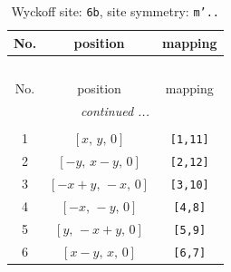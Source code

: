 \documentclass[fleqn,8pt]{jsarticle}
\begin{document}
\begin{longtable}{ccc}
\caption{Wyckoff site: {\tt 6b}, site symmetry: {\tt m'..}}
 \\
 \hline \hline
No. & position & mapping \\ \hline \endfirsthead

\multicolumn{2}{l}{\tablename\ \thetable{}} \\
 \hline \hline
No. & position & mapping \\ \hline \endhead

 \hline \hline
\multicolumn{2}{r}{\footnotesize\it continued ...} \\ \endfoot

 \hline \hline
\multicolumn{2}{r}{} \\ \endlastfoot

1 & $\left[ x,\, y,\, 0 \right]$ & {\tt [1,11]} \\ \hline
2 & $\left[ - y,\, x - y,\, 0 \right]$ & {\tt [2,12]} \\ \hline
3 & $\left[ - x + y,\, - x,\, 0 \right]$ & {\tt [3,10]} \\ \hline
4 & $\left[ - x,\, - y,\, 0 \right]$ & {\tt [4,8]} \\ \hline
5 & $\left[ y,\, - x + y,\, 0 \right]$ & {\tt [5,9]} \\ \hline
6 & $\left[ x - y,\, x,\, 0 \right]$ & {\tt [6,7]} \\
\end{longtable}
\renewcommand{\arraystretch}{1.2}
\end{document}
